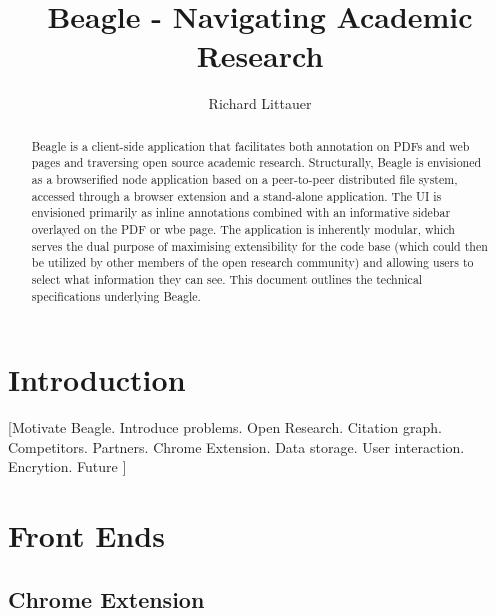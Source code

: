\documentclass{sig-alternate}
\begin{document}
\title{Beagle - Navigating Academic Research}
\subtitle{}


\author{
%
%
\alignauthor
  Richard Littauer\\
}

\maketitle
\begin{abstract}
Beagle is a client-side application that facilitates both annotation on PDFs and web
pages and traversing open source academic research. Structurally, Beagle is
envisioned as a browserified node application based on a peer-to-peer distributed
file system, accessed through a browser extension and a stand-alone application.
The UI is envisioned primarily as inline annotations combined with an informative
sidebar overlayed on the PDF or wbe page. The application is inherently modular,
which serves the dual purpose of maximising extensibility for the code base
(which could then be utilized by other members of the open research community)
and allowing users to select what information they can see. This document outlines
the technical specifications underlying Beagle.
\end{abstract}

\section{Introduction}

[Motivate Beagle. Introduce problems. Open Research. Citation graph. Competitors.
Partners. Chrome Extension. Data storage. User interaction. Encrytion. Future ]

\section{Front Ends}
\subsection{Chrome Extension}
\end{document}
